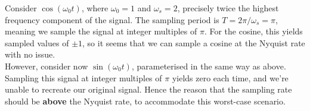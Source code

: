 %
\begin{exmp}
  Consider $\cos(\omega_0 t)$, where $\omega_0 = 1$ and $\omega_s = 2$,
  precisely twice the highest frequency component of the signal. The sampling
  period is $T = 2\pi / \omega_s = \pi$, meaning we sample the signal at
  integer multiples of $\pi$. For the cosine, this yields sampled values of
  $\pm 1$, so it seems that we can sample a cosine at the Nyquist rate with
  no issue.\\
  However, consider now $\sin(\omega_0 t)$, parameterised in the same way as
  above. Sampling this signal at integer multiples of $\pi$ yields zero each
  time, and we're unable to recreate our original signal. Hence the reason
  that the sampling rate should be \textbf{above} the Nyquist rate, to
  accommodate this worst-case scenario.
\end{exmp}
